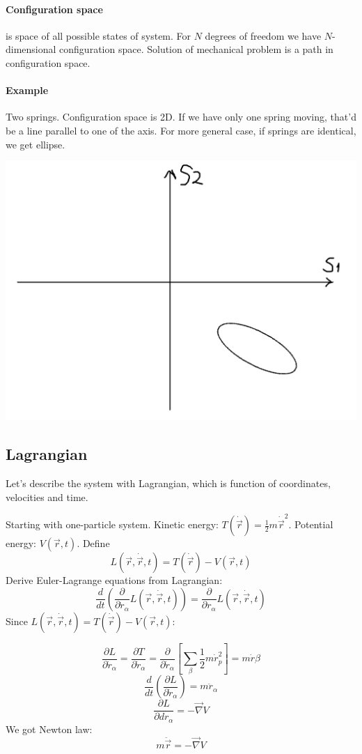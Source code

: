 \paragraph{Configuration space} is space of all possible states of system. For $N$ degrees of freedom we have $N$-dimensional configuration space. Solution of mechanical problem is a path in configuration space.
\paragraph{Example}
Two springs. Configuration space is 2D. If we have only one spring moving, that'd be a line parallel to one of the axis. For more general case, if springs are identical, we get ellipse.

\begin{center}
	\includegraphics[width=0.5\linewidth]{./lect1/1.png}
\end{center}

\subsection{Lagrangian}
Let's describe the system with Lagrangian, which is function of coordinates, velocities and time.

Starting with one-particle system. Kinetic energy: $T(\dot{\vec{r}})=\frac{1}{2}m\dot{\vec{r}}^2$. Potential energy: $V(\vec{r}, t)$. Define
$$L(\vec{r}, \dot{\vec{r}}, t) = T(\dot{\vec{r}}) - V(\vec{r},t)$$
Derive Euler-Lagrange equations from Lagrangian:
$$\frac{d}{dt}\left( \frac{\partial}{\partial \dot{r}_\alpha} L(\vec{r}, \dot{\vec{r}}, t) \right) = \frac{\partial}{\partial r_\alpha} L(\vec{r}, \dot{\vec{r}}, t) $$
Since $L(\vec{r}, \dot{\vec{r}}, t) = T(\dot{\vec{r}}) - V(\vec{r},t)$:

$$\frac{\partial L}{\partial \dot{r}_\alpha} = \frac{\partial T}{\partial \dot{r}_\alpha} = \frac{\partial}{\partial \dot{r}_\alpha} \left[ \sum_{\beta} \frac{1}{2}m\dot{r}^2_p \right] = m\dot{r}\beta$$
$$\frac{d}{dt} \left( \frac{\partial L}{\partial \dot{r}_\alpha} \right) = m\ddot{r}_\alpha $$
$$\frac{\partial L}{\partial dr_\alpha} = -\vec{\nabla} V$$
We got Newton law:
$$m\ddot{\vec{r}} = -\vec{\nabla} V$$
